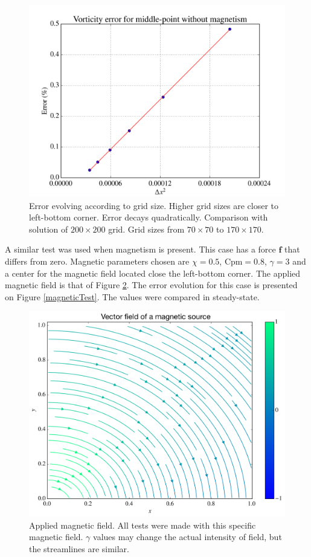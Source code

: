 \documentclass[journal]{IEEEtran}
\begin{document}
\begin{figure}[!t]
\centering
\includegraphics[width=\linewidth]{figures/validateHydrodynamicsRe40}
\caption{Error evolving according to grid size. Higher grid sizes are closer to left-bottom corner. Error decays quadratically. Comparison with solution of $200\times 200$ grid. Grid sizes from $70\times 70$ to $170\times 170$. \label{hydrodynamicsTest}}
\end{figure}

A similar test was used when magnetism is present. This case has a force $\mathbf{f}$ that differs from zero. Magnetic parameters chosen are $\chi=0.5$, $\mathrm{Cpm}=0.8$, $\gamma=3$ and a center for the magnetic field located close the left-bottom corner. The applied magnetic field is that of Figure \ref{magneticField}. The error evolution for this case is presented on Figure \ref{magneticTest}. The values were compared in steady-state.


\begin{figure}[!t]
\centering
\includegraphics[width=\linewidth]{figures/vectorFieldH}
\caption{Applied magnetic field. All tests were made with this specific magnetic field. $\gamma$ values may change the actual intensity of field, but the streamlines are similar.\label{magneticField}}
\end{figure}
\end{document}
